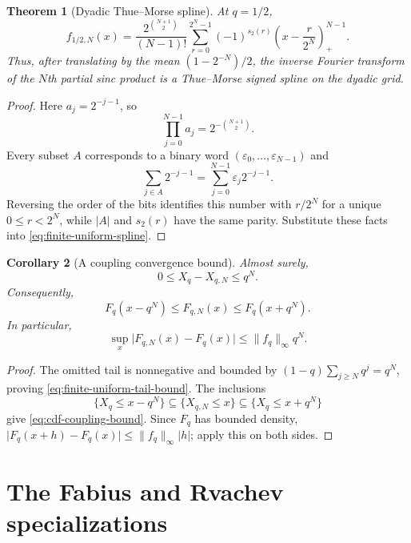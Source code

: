 \documentclass[11pt,oneside,openany]{book}
\newtheorem{theorem}{Theorem}[chapter]
\newtheorem{corollary}[theorem]{Corollary}
\theoremstyle{definition}
\theoremstyle{remark}
\newcommand{\abs}[1]{\lvert #1\rvert}
\newcommand{\norm}[1]{\lVert #1\rVert}
\begin{document}
\begin{theorem}[Dyadic Thue--Morse spline]\label{thm:dyadic-thue-morse-spline}
At $q=1/2$,
\begin{equation}\label{eq:dyadic-thue-morse-spline}
 f_{1/2,N}(x)
 =\frac{2^{\binom{N+1}{2}}}{(N-1)!}
 \sum_{r=0}^{2^N-1}(-1)^{s_2(r)}
 \left(x-\frac r{2^N}\right)_+^{N-1}.
\end{equation}
Thus, after translating by the mean $(1-2^{-N})/2$, the inverse Fourier transform of the $N$th partial sinc product is a Thue--Morse signed spline on the dyadic grid.
\end{theorem}

\begin{proof}
Here $a_j=2^{-j-1}$, so
\[
 \prod_{j=0}^{N-1}a_j=2^{-\binom{N+1}{2}}.
\]
Every subset $A$ corresponds to a binary word $(\varepsilon_0,\ldots,\varepsilon_{N-1})$ and
\[
 \sum_{j\in A}2^{-j-1}
 =\sum_{j=0}^{N-1}\varepsilon_j2^{-j-1}.
\]
Reversing the order of the bits identifies this number with $r/2^N$ for a unique
$0\le r<2^N$, while $\abs A$ and $s_2(r)$ have the same parity.  Substitute these facts into \eqref{eq:finite-uniform-spline}.
\end{proof}

\begin{corollary}[A coupling convergence bound]\label{cor:finite-uniform-convergence}
Almost surely,
\begin{equation}\label{eq:finite-uniform-tail-bound}
 0\le X_q-X_{q,N}\le q^N.
\end{equation}
Consequently,
\begin{equation}\label{eq:cdf-coupling-bound}
 F_q(x-q^N)\le F_{q,N}(x)\le F_q(x+q^N).
\end{equation}
In particular,
\begin{equation}\label{eq:cdf-uniform-rate}
 \sup_x\abs{F_{q,N}(x)-F_q(x)}
 \le \norm{f_q}_\infty q^N.
\end{equation}
\end{corollary}

\begin{proof}
The omitted tail is nonnegative and bounded by
$(1-q)\sum_{j\ge N}q^j=q^N$, proving
\eqref{eq:finite-uniform-tail-bound}.  The inclusions
\[
 \{X_q\le x-q^N\}\subseteq\{X_{q,N}\le x\}
 \subseteq\{X_q\le x+q^N\}
\]
give \eqref{eq:cdf-coupling-bound}.  Since $F_q$ has bounded density,
$\abs{F_q(x+h)-F_q(x)}\le\norm{f_q}_\infty\abs h$; apply this on both sides.
\end{proof}

\section{The Fabius and Rvachev specializations}
\end{document}
